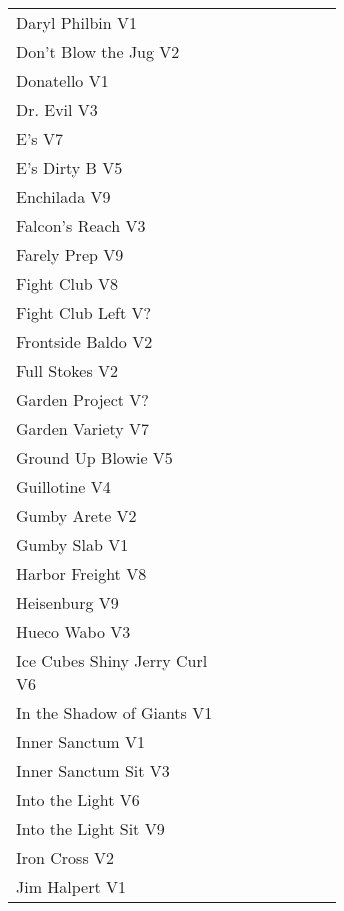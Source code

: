 \begin{center}
\begin{supertabular}{p{0.65\linewidth}r}
Daryl Philbin V1 & \pageref{rt:Daryl Philbin} \\
Don't Blow the Jug V2 & \pageref{rt:Don't Blow the Jug} \\
Donatello V1 & \pageref{rt:Donatello} \\
Dr. Evil V3 & \pageref{rt:Dr. Evil} \\
E's V7 & \pageref{rt:E's} \\
E's Dirty B V5 & \pageref{rt:E's Dirty B} \\
Enchilada V9 & \pageref{rt:Enchilada} \\
Falcon's Reach V3 & \pageref{rt:Falcon's Reach} \\
Farely Prep V9 & \pageref{rt:Farely Prep} \\
Fight Club V8 & \pageref{rt:Fight Club} \\
Fight Club Left V? & \pageref{rt:Fight Club Left} \\
Frontside Baldo V2 & \pageref{rt:Frontside Baldo} \\
Full Stokes V2 & \pageref{rt:Full Stokes} \\
Garden Project V? & \pageref{rt:Garden Project} \\
Garden Variety V7 & \pageref{rt:Garden Variety} \\
Ground Up Blowie V5 & \pageref{rt:Ground Up Blowie} \\
Guillotine V4 & \pageref{rt:Guillotine} \\
Gumby Arete V2 & \pageref{rt:Gumby Arete} \\
Gumby Slab V1 & \pageref{rt:Gumby Slab} \\
Harbor Freight V8 & \pageref{vr:Harbor Freight} \\
Heisenburg V9 & \pageref{rt:Heisenburg} \\
Hueco Wabo V3 & \pageref{rt:Hueco Wabo} \\
Ice Cubes Shiny Jerry Curl V6 & \pageref{rt:Ice Cubes Shiny Jerry Curl} \\
In the Shadow of Giants V1 & \pageref{rt:In the Shadow of Giants} \\
Inner Sanctum V1 & \pageref{rt:Inner Sanctum} \\
Inner Sanctum Sit V3 & \pageref{vr:Inner Sanctum Sit} \\
Into the Light V6 & \pageref{rt:Into the Light} \\
Into the Light Sit V9 & \pageref{vr:Into the Light Sit} \\
Iron Cross V2 & \pageref{vr:Iron Cross} \\
Jim Halpert V1 & \pageref{rt:Jim Halpert} \\

\end{supertabular}
\end{center}
